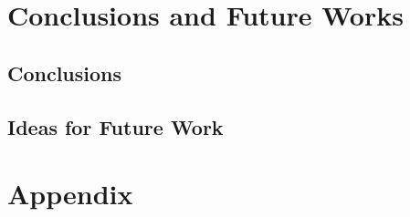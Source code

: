 \documentclass[12pt]{report}
\begin{document}
\lipsum[2-4]



\chapter{Conclusions and Future Works}

\section{Conclusions}



\lipsum[2-4]



\section{Ideas for Future Work}















%














\appendix

\chapter{Appendix}

\lipsum[2-3]
\end{document}
